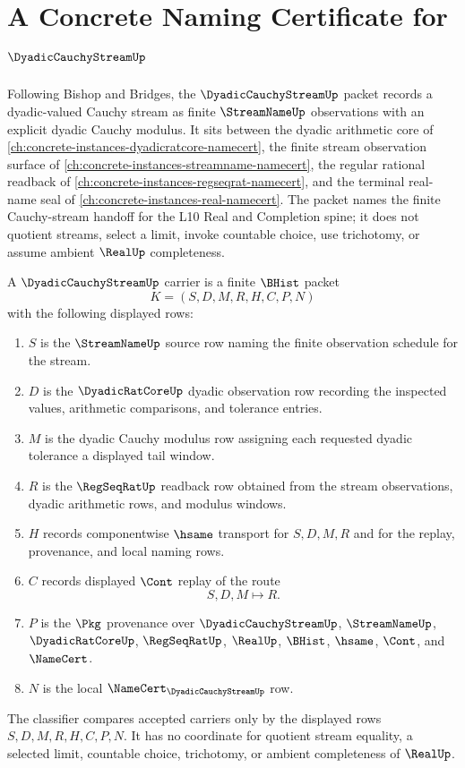 \chapter{A Concrete Naming Certificate for $\DyadicCauchyStreamUp$}
\label{ch:concrete-instances-dyadic-cauchy-stream-namecert}

Following Bishop and Bridges, the $\DyadicCauchyStreamUp$ packet records a dyadic-valued Cauchy stream as finite $\StreamNameUp$ observations with an explicit dyadic Cauchy modulus. It sits between the dyadic arithmetic core of \autoref{ch:concrete-instances-dyadicratcore-namecert}, the finite stream observation surface of \autoref{ch:concrete-instances-streamname-namecert}, the regular rational readback of \autoref{ch:concrete-instances-regseqrat-namecert}, and the terminal real-name seal of \autoref{ch:concrete-instances-real-namecert}. The packet names the finite Cauchy-stream handoff for the L10 Real and Completion spine; it does not quotient streams, select a limit, invoke countable choice, use trichotomy, or assume ambient $\RealUp$ completeness.

\begin{definition}
\label{def:dyadic-cauchy-stream-carrier}
A $\DyadicCauchyStreamUp$ carrier is a finite $\BHist$ packet
$$
K=(S,D,M,R,H,C,P,N)
$$
with the following displayed rows:
\begin{enumerate}
\item $S$ is the $\StreamNameUp$ source row naming the finite observation schedule for the stream.
\item $D$ is the $\DyadicRatCoreUp$ dyadic observation row recording the inspected values, arithmetic comparisons, and tolerance entries.
\item $M$ is the dyadic Cauchy modulus row assigning each requested dyadic tolerance a displayed tail window.
\item $R$ is the $\RegSeqRatUp$ readback row obtained from the stream observations, dyadic arithmetic rows, and modulus windows.
\item $H$ records componentwise $\hsame$ transport for $S,D,M,R$ and for the replay, provenance, and local naming rows.
\item $C$ records displayed $\Cont$ replay of the route
$$
S,D,M \longmapsto R .
$$
\item $P$ is the $\Pkg$ provenance over $\DyadicCauchyStreamUp$, $\StreamNameUp$, $\DyadicRatCoreUp$, $\RegSeqRatUp$, $\RealUp$, $\BHist$, $\hsame$, $\Cont$, and $\NameCert$.
\item $N$ is the local $\NameCert_{\DyadicCauchyStreamUp}$ row.
\end{enumerate}
The classifier compares accepted carriers only by the displayed rows $S,D,M,R,H,C,P,N$. It has no coordinate for quotient stream equality, a selected limit, countable choice, trichotomy, or ambient completeness of $\RealUp$.
\end{definition}

